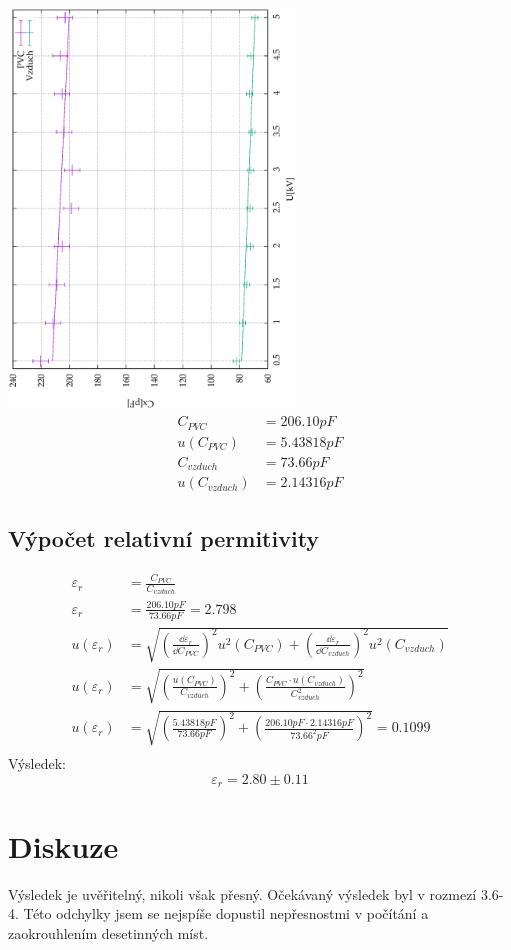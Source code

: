 \documentclass[titlepage]{article}
\begin{document}
    			\includegraphics[width=3in, angle=-90, origin=c]{gr-graf-1620764421-color.ps}
    			\begin{align*}
    				C_{PVC} &= 206.10 pF\\
    				u(C_{PVC}) &=  5.43818pF\\
    				C_{vzduch} &= 73.66pF\\
    				u(C_{vzduch}) &= 2.14316pF
    			\end{align*}
    		\subsection{Výpočet relativní permitivity}
    			\begin{align*}
    				\varepsilon_r &= \frac{C_{PVC}}{C_{vzduch}}\\
    				\varepsilon_r &= \frac{206.10 pF}{73.66pF} = 2.798\\
    				u(\varepsilon_r) &= \sqrt{(\frac{\dd{\varepsilon_r}}{\dd{C_{PVC}}})^2u^2(C_{PVC}) + (\frac{\dd{\varepsilon_r}}{\dd{C_{vzduch}}})^2u^2(C_{vzduch})}\\
    				u(\varepsilon_r) &= \sqrt{(\frac{u(C_{PVC})}{C_{vzduch}})^2 + (\frac{C_{PVC} \cdot u(C_{vzduch})}{C_{vzduch}^2})^2}\\
    				u(\varepsilon_r) &= \sqrt{(\frac{5.43818pF}{73.66pF})^2 + (\frac{206.10 pF \cdot 2.14316pF}{73.66^2pF})^2} = 0.1099\\
    			\end{align*}
    			Výsledek:
    				$$ \varepsilon_r = 2.80 \pm 0.11 $$
  	\section{Diskuze}
  		Výsledek je uvěřitelný, nikoli však přesný. Očekávaný výsledek byl v rozmezí 3.6-4. Této odchylky jsem se nejspíše dopustil nepřesnostmi v počítání a zaokrouhlením desetinných míst.
\end{document}
